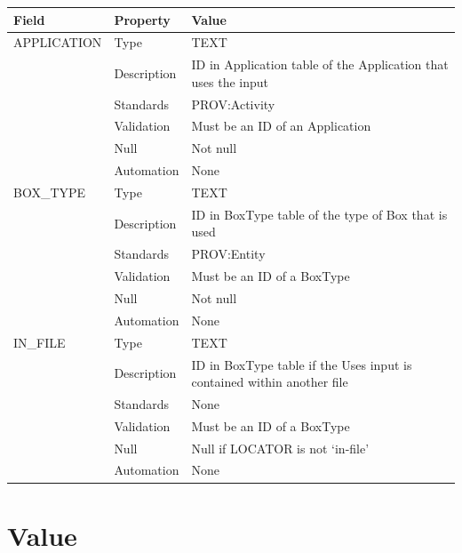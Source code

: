 \begin{longtable}[]{@{}
  >{\raggedright\arraybackslash}p{}
  >{\raggedright\arraybackslash}p{}
  >{\raggedright\arraybackslash}p{}@{}}
\toprule\noalign{}
\begin{minipage}[b]{\linewidth}\raggedright
Field
\end{minipage} & \begin{minipage}[b]{\linewidth}\raggedright
Property
\end{minipage} & \begin{minipage}[b]{\linewidth}\raggedright
Value
\end{minipage} \\
\midrule\noalign{}
\endhead
\bottomrule\noalign{}
\endlastfoot
APPLICATION & Type & TEXT \\
& Description & ID in Application table of the Application that uses the
input \\
& Standards & PROV:Activity \\
& Validation & Must be an ID of an Application \\
& Null & Not null \\
& Automation & None \\
BOX\_TYPE & Type & TEXT \\
& Description & ID in BoxType table of the type of Box that is used \\
& Standards & PROV:Entity \\
& Validation & Must be an ID of a BoxType \\
& Null & Not null \\
& Automation & None \\
IN\_FILE & Type & TEXT \\
& Description & ID in BoxType table if the Uses input is contained
within another file \\
& Standards & None \\
& Validation & Must be an ID of a BoxType \\
& Null & Null if LOCATOR is not `in-file' \\
& Automation & None \\
\end{longtable}

\section{Value}\label{value}

